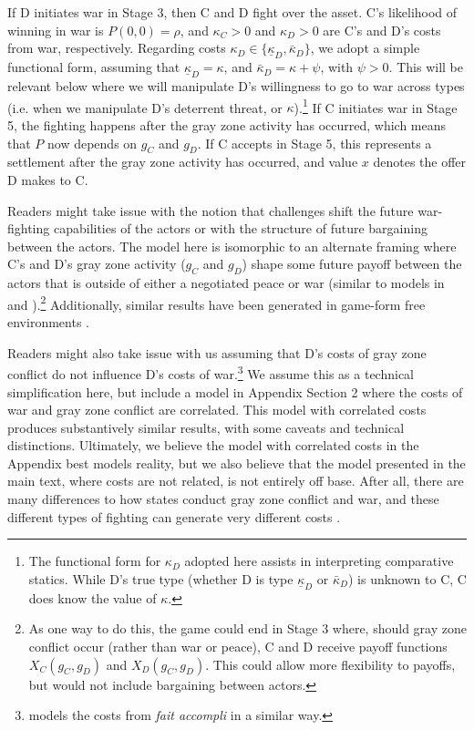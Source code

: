 \documentclass[11pt,letterpaper,pdftex,dvipsnames,table]{article}
\begin{document}
If D initiates war in Stage 3, then C and D fight over the asset. C's likelihood of winning in war is $P(0,0)=\rho$, and $\kappa_{C}>0$ and $\kappa_{D}>0$ are C's and D's costs from war, respectively. Regarding costs $\kappa_{D}\in\{\underline{\kappa}_{D},\bar{\kappa}_{D}\}$, we adopt a simple functional form, assuming that $\underline{\kappa}_{D}=\kappa$, and $\bar{\kappa}_{D}=\kappa+\psi$, with $\psi>0$. This will be relevant below where we will manipulate D's willingness to go to war across types (i.e. when we manipulate D's deterrent threat, or $\kappa$).\footnote{The functional form for $\kappa_{D}$ adopted here assists in interpreting comparative statics. While D's true type (whether D is type $\underline{\kappa}_{D}$ or $\bar{\kappa}_{D}$) is unknown to C, C does know the value of $\kappa$.} If C initiates war in Stage 5, the fighting happens after the gray zone activity has occurred, which means that $P$ now depends on $g_{C}$ and $g_{D}$. If C accepts in Stage 5, this represents a settlement after the gray zone activity has occurred, and value $x$ denotes the offer D makes to C.

Readers might take issue with the notion that challenges shift the future war-fighting capabilities of the actors or with the structure of future bargaining between the actors. The model here is isomorphic to an alternate framing where C's and D's gray zone activity ($g_{C}$ and $g_{D}$) shape some future payoff between the actors that is outside of either a negotiated peace or war (similar to models in \citet{tarar_strategiclogicmilitary_2016} and \citet{gurantz_fearappeasementeffectiveness_2017}).\footnote{As one way to do this, the game could end in Stage 3 where, should gray zone conflict occur (rather than war or peace), C and D receive payoff functions $X_{C}(g_{C},g_{D})$ and $X_{D}(g_{C},g_{D})$. This could allow more flexibility to payoffs, but would not include bargaining between actors.} Additionally, similar results have been generated in game-form free environments \citep{kenkel_uncertaintycrisisbargaining_2021}.

Readers might also take issue with us assuming that D's costs of gray zone conflict  do not influence D's costs of war.\footnote{\citet{tarar_strategiclogicmilitary_2016} models the costs from \textit{fait accompli} in a similar way.} We assume this as a technical simplification here, but include a model in Appendix Section 2 where the costs of war and gray zone conflict are correlated. This model with correlated costs produces substantively similar results, with some caveats and technical distinctions. Ultimately, we believe the model with correlated costs in the Appendix best models reality, but we also believe that the model presented in the main text, where costs are not related, is not entirely off base. After all, there are many differences to how states conduct gray zone conflict and war, and these different types of fighting can generate very different costs \citep{kenkel_uncertaintycrisisbargaining_2021}.
\end{document}

